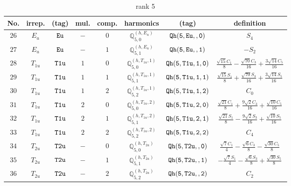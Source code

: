 \documentclass[fleqn,8pt]{jsarticle}
\begin{document}
\begin{table}[ht!]
\begin{center}
\caption{rank 5}
\renewcommand{\arraystretch}{1.3}
\begin{tabular}{cccccccc} \hline \hline
No. & irrep. & (tag) & mul. & comp. & harmonics & (tag) & definition \\ \hline
$ 26 $ & $ E_{u} $ & $ {\tt Eu} $ & $ - $ & $ 0 $ & $ \mathbb{Q}_{5,0}^{(h,E_{u})} $ & $ {\tt Qh(5,Eu,,0)} $ & $ S_{4} $ \\
$ 27 $ & $ E_{u} $ & $ {\tt Eu} $ & $ - $ & $ 1 $ & $ \mathbb{Q}_{5,1}^{(h,E_{u})} $ & $ {\tt Qh(5,Eu,,1)} $ & $ - S_{2} $ \\
$ 28 $ & $ T_{1u} $ & $ {\tt T1u} $ & $ 1 $ & $ 0 $ & $ \mathbb{Q}_{5,0}^{(h,T_{1u},1)} $ & $ {\tt Qh(5,T1u,1,0)} $ & $ \frac{\sqrt{15} C_{1}}{8} - \frac{\sqrt{70} C_{3}}{16} + \frac{3 \sqrt{14} C_{5}}{16} $ \\
$ 29 $ & $ T_{1u} $ & $ {\tt T1u} $ & $ 1 $ & $ 1 $ & $ \mathbb{Q}_{5,1}^{(h,T_{1u},1)} $ & $ {\tt Qh(5,T1u,1,1)} $ & $ \frac{\sqrt{15} S_{1}}{8} + \frac{\sqrt{70} S_{3}}{16} + \frac{3 \sqrt{14} S_{5}}{16} $ \\
$ 30 $ & $ T_{1u} $ & $ {\tt T1u} $ & $ 1 $ & $ 2 $ & $ \mathbb{Q}_{5,2}^{(h,T_{1u},1)} $ & $ {\tt Qh(5,T1u,1,2)} $ & $ C_{0} $ \\
$ 31 $ & $ T_{1u} $ & $ {\tt T1u} $ & $ 2 $ & $ 0 $ & $ \mathbb{Q}_{5,0}^{(h,T_{1u},2)} $ & $ {\tt Qh(5,T1u,2,0)} $ & $ \frac{\sqrt{21} C_{1}}{8} + \frac{9 \sqrt{2} C_{3}}{16} + \frac{\sqrt{10} C_{5}}{16} $ \\
$ 32 $ & $ T_{1u} $ & $ {\tt T1u} $ & $ 2 $ & $ 1 $ & $ \mathbb{Q}_{5,1}^{(h,T_{1u},2)} $ & $ {\tt Qh(5,T1u,2,1)} $ & $ \frac{\sqrt{21} S_{1}}{8} - \frac{9 \sqrt{2} S_{3}}{16} + \frac{\sqrt{10} S_{5}}{16} $ \\
$ 33 $ & $ T_{1u} $ & $ {\tt T1u} $ & $ 2 $ & $ 2 $ & $ \mathbb{Q}_{5,2}^{(h,T_{1u},2)} $ & $ {\tt Qh(5,T1u,2,2)} $ & $ C_{4} $ \\
$ 34 $ & $ T_{2u} $ & $ {\tt T2u} $ & $ - $ & $ 0 $ & $ \mathbb{Q}_{5,0}^{(h,T_{2u})} $ & $ {\tt Qh(5,T2u,,0)} $ & $ \frac{\sqrt{7} C_{1}}{4} - \frac{\sqrt{6} C_{3}}{8} - \frac{\sqrt{30} C_{5}}{8} $ \\
$ 35 $ & $ T_{2u} $ & $ {\tt T2u} $ & $ - $ & $ 1 $ & $ \mathbb{Q}_{5,1}^{(h,T_{2u})} $ & $ {\tt Qh(5,T2u,,1)} $ & $ - \frac{\sqrt{7} S_{1}}{4} - \frac{\sqrt{6} S_{3}}{8} + \frac{\sqrt{30} S_{5}}{8} $ \\
$ 36 $ & $ T_{2u} $ & $ {\tt T2u} $ & $ - $ & $ 2 $ & $ \mathbb{Q}_{5,2}^{(h,T_{2u})} $ & $ {\tt Qh(5,T2u,,2)} $ & $ C_{2} $ \\
 \hline \hline
\end{tabular}
\end{center}
\end{table}
\end{document}
